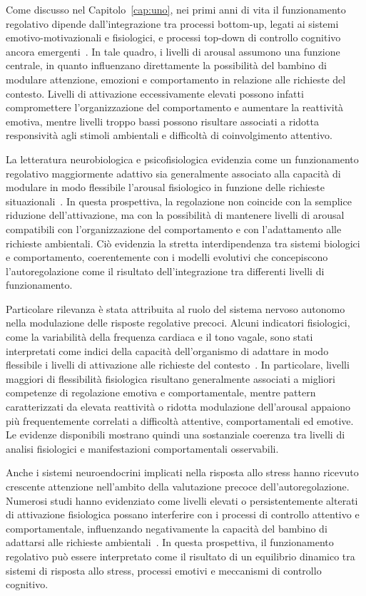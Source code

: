             Come discusso nel Capitolo~\ref{cap:uno}, nei primi anni di vita il funzionamento regolativo dipende dall'integrazione tra processi bottom-up, legati ai sistemi emotivo-motivazionali e fisiologici, e processi top-down di controllo cognitivo ancora emergenti~\cite{blair2015}. In tale quadro, i livelli di arousal assumono una funzione centrale, in quanto influenzano direttamente la possibilità del bambino di modulare attenzione, emozioni e comportamento in relazione alle richieste del contesto. Livelli di attivazione eccessivamente elevati possono infatti compromettere l'organizzazione del comportamento e aumentare la reattività emotiva, mentre livelli troppo bassi possono risultare associati a ridotta responsività agli stimoli ambientali e difficoltà di coinvolgimento attentivo.

            La letteratura neurobiologica e psicofisiologica evidenzia come un funzionamento regolativo maggiormente adattivo sia generalmente associato alla capacità di modulare in modo flessibile l'arousal fisiologico in funzione delle richieste situazionali~\cite{calkins2007,blair2010}. In questa prospettiva, la regolazione non coincide con la semplice riduzione dell'attivazione, ma con la possibilità di mantenere livelli di arousal compatibili con l'organizzazione del comportamento e con l'adattamento alle richieste ambientali. Ciò evidenzia la stretta interdipendenza tra sistemi biologici e comportamento, coerentemente con i modelli evolutivi che concepiscono l'autoregolazione come il risultato dell'integrazione tra differenti livelli di funzionamento.

            Particolare rilevanza è stata attribuita al ruolo del sistema nervoso autonomo nella modulazione delle risposte regolative precoci. Alcuni indicatori fisiologici, come la variabilità della frequenza cardiaca e il tono vagale, sono stati interpretati come indici della capacità dell'organismo di adattare in modo flessibile i livelli di attivazione alle richieste del contesto~\cite{porges1994,calkins2007}. In particolare, livelli maggiori di flessibilità fisiologica risultano generalmente associati a migliori competenze di regolazione emotiva e comportamentale, mentre pattern caratterizzati da elevata reattività o ridotta modulazione dell'arousal appaiono più frequentemente correlati a difficoltà attentive, comportamentali ed emotive. Le evidenze disponibili mostrano quindi una sostanziale coerenza tra livelli di analisi fisiologici e manifestazioni comportamentali osservabili.

            Anche i sistemi neuroendocrini implicati nella risposta allo stress hanno ricevuto crescente attenzione nell'ambito della valutazione precoce dell'autoregolazione. Numerosi studi hanno evidenziato come livelli elevati o persistentemente alterati di attivazione fisiologica possano interferire con i processi di controllo attentivo e comportamentale, influenzando negativamente la capacità del bambino di adattarsi alle richieste ambientali~\cite{blair2010,blair2015}. In questa prospettiva, il funzionamento regolativo può essere interpretato come il risultato di un equilibrio dinamico tra sistemi di risposta allo stress, processi emotivi e meccanismi di controllo cognitivo.

